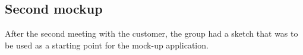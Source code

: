\subsection*{Second mockup}
After the second meeting with the customer, the group had a sketch that was to be used as a starting point for the mock-up application. \\
\setlength\fboxsep{0pt}
\setlength\fboxrule{1pt}


